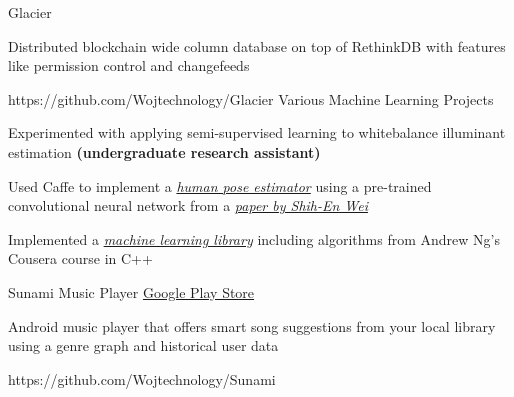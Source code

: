 \begin{cvprojects}
  \cvproject
    {Glacier}
    {}
    {
      \begin{cvitems}
        \item Distributed blockchain wide column database on top of RethinkDB with features like permission control and changefeeds
      \end{cvitems}
    }
    {https://github.com/Wojtechnology/Glacier}
  \cvproject
    {Various Machine Learning Projects}
    {}
    {
      \begin{cvitems}
        \item Experimented with applying semi-supervised learning to whitebalance illuminant estimation \textbf{(undergraduate research assistant)}
        \item Used Caffe to implement a \textit{\href{https://github.com/Wojtechnology/WheresRares}{human pose estimator}} using a pre-trained convolutional neural network from a \textit{\href{https://arxiv.org/abs/1602.00134}{paper by Shih-En Wei}}
        \item Implemented a \textit{\href{https://github.com/Wojtechnology/ML}{machine learning library}} including algorithms from Andrew Ng's Cousera course in C++
      \end{cvitems}
    }
    {}
  \cvproject
    {Sunami Music Player}
    {\href{http://play.google.com/store/apps/details?id=com.wojtechnology.sunami}{Google Play Store}}
    {
      \begin{cvitems}
        \item Android music player that offers smart song suggestions from your local library using a genre graph and historical user data
      \end{cvitems}
    }
    {https://github.com/Wojtechnology/Sunami}
\end{cvprojects}
